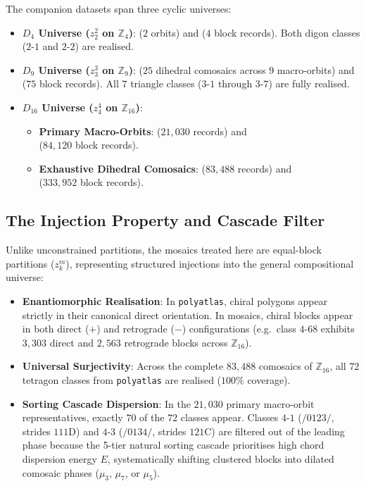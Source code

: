 The companion datasets span three cyclic universes:
\begin{itemize}
    \item \textbf{$D_4$ Universe ($z_2^2$ on $\mathbb{Z}_4$)}:
     ($2$ orbits) and  ($4$ block records). Both digon classes ($2\text{-}1$ and $2\text{-}2$) are realised.
    
    \item \textbf{$D_9$ Universe ($z_3^3$ on $\mathbb{Z}_9$)}:
     ($25$ dihedral comosaics across $9$ macro-orbits) and  ($75$ block records). All $7$ triangle classes ($3\text{-}1$ through $3\text{-}7$) are fully realised.
    
    \item \textbf{$D_{16}$ Universe ($z_4^4$ on $\mathbb{Z}_{16}$)}:
    \begin{itemize}
        \item \textbf{Primary Macro-Orbits}:
         ($21{,}030$ records) and\\
         ($84{,}120$ block records).
        \item \textbf{Exhaustive Dihedral Comosaics}:
         ($83{,}488$ records) and\\
         ($333{,}952$ block records).
    \end{itemize}
\end{itemize}

\subsection{The Injection Property and Cascade Filter}

Unlike unconstrained partitions, the mosaics treated here are equal-block partitions ($z_k^m$), representing structured injections into the general compositional universe:
\begin{itemize}
    \item \textbf{Enantiomorphic Realisation}: In \texttt{polyatlas}, chiral polygons appear strictly in their canonical direct orientation. In mosaics, chiral blocks appear in both direct ($+$) and retrograde ($-$) configurations (e.g.\ class $4\text{-}68$ exhibits $3{,}303$ direct and $2{,}563$ retrograde blocks across $\mathbb{Z}_{16}$).
    \item \textbf{Universal Surjectivity}: Across the complete $83{,}488$ comosaics of $\mathbb{Z}_{16}$, all $72$ tetragon classes from \texttt{polyatlas} are realised ($100\%$ coverage).
    \item \textbf{Sorting Cascade Dispersion}: In the $21{,}030$ primary macro-orbit representatives, exactly $70$ of the $72$ classes appear. Classes $4\text{-}1$ ($/0123/$, strides $111\text{D}$) and $4\text{-}3$ ($/0134/$, strides $121\text{C}$) are filtered out of the leading phase because the 5-tier natural sorting cascade prioritises high chord dispersion energy $E$, systematically shifting clustered blocks into dilated comosaic phases ($\mu_3$, $\mu_7$, or $\mu_5$).
\end{itemize}

